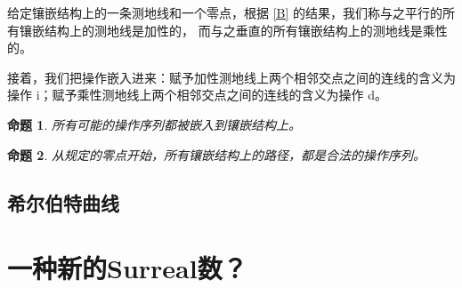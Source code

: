 \documentclass[a4paper,12pt]{article}
\newtheorem{proposition}{命题}
\begin{document}
给定镶嵌结构上的一条测地线和一个零点，根据 \ref{B} 的结果，我们称与之平行的所有镶嵌结构上的测地线是加性的，
而与之垂直的所有镶嵌结构上的测地线是乘性的。

接着，我们把操作嵌入进来：赋予加性测地线上两个相邻交点之间的连线的含义为操作 i；赋予乘性测地线上两个相邻交点之间的连线的含义为操作 d。

\begin{proposition}
\label{C}
所有可能的操作序列都被嵌入到镶嵌结构上。
\end{proposition}

\begin{proposition}
\label{D}
从规定的零点开始，所有镶嵌结构上的路径，都是合法的操作序列。
\end{proposition}


\subsection{希尔伯特曲线}

\section{一种新的Surreal数？}
\end{document}
